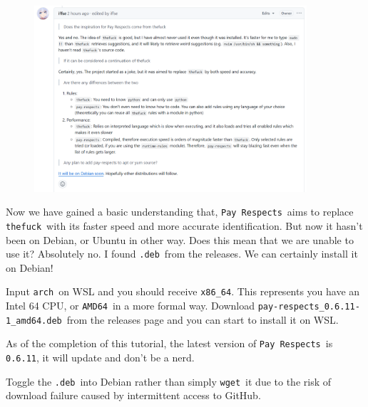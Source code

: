 \documentclass[12pt]{ctexart}
\newenvironment{mdquote}
{%
  \par\noindent
  \begin{list}{}{%
      \setlength{\leftmargin}{1em}%
      \setlength{\rightmargin}{0pt}%
      \setlength{\itemindent}{0pt}%
      \setlength{\listparindent}{\parindent}%
      \setlength{\topsep}{0.5\baselineskip}%
  }
  \item[\textbf{>}\ ]\itshape
}
{\end{list}\par}
\begin{document}
\begin{figure}[H]
    \centering
    \includegraphics[width=0.9\textwidth,keepaspectratio]{assets/Linux/2.5 What's the first word when messing up a command/4.png}
\end{figure}

Now we have gained a basic understanding that, \texttt{Pay\ Respects}\
aims to replace \texttt{thefuck}\ with its faster speed and more accurate
identification. But now it hasn't been on Debian, or
Ubuntu in other way. Does this mean that we are unable to use it?
Absolutely no. I found \texttt{.deb}\ from the releases. We can certainly
install it on Debian!

Input \texttt{arch}\ on WSL and you should receive \texttt{x86\_64}. This
represents you have an Intel 64 CPU, or \texttt{AMD64}\ in a more formal
way. Download \texttt{pay-respects\_0.6.11-1\_amd64.deb}\ from the
releases page and you can start to install it on WSL.

\begin{mdquote}
As of the completion of this tutorial, the latest version of
\texttt{Pay\ Respects}\ is \texttt{0.6.11}, it will update and
don't be a nerd.
\end{mdquote}

Toggle the \texttt{.deb}\ into Debian rather than simply \texttt{wget}\ it
due to the risk of download failure caused by intermittent access to
GitHub.
\end{document}
